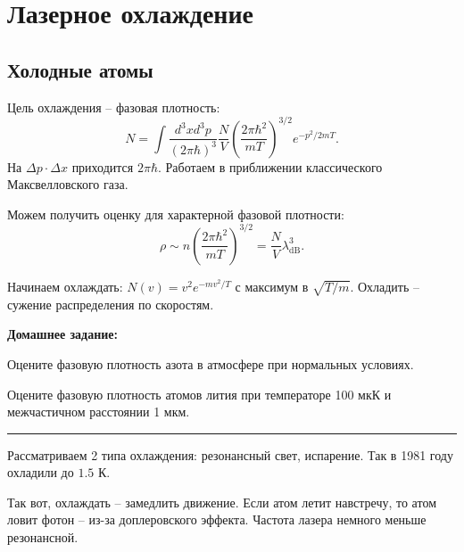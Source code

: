 
% 
% 



\section{Лазерное охлаждение} 

\subsection{Холодные атомы}

Цель охлаждения -- фазовая плотность:
\begin{equation*}
    N = \int \frac{d^3 x d^3 p}{(2\pi \hbar)^3} \frac{N}{V} 
    \left(
        \frac{2\pi \hbar^2}{mT}
    \right)^{3/2} e^{-p^2/2mT}.
\end{equation*}
На $\Delta p \cdot \Delta x$ приходится $2 \pi \hbar$. Работаем в приближении классического Максвелловского газа. 

Можем получить оценку для характерной фазовой плотности:
\begin{equation*}
    \rho \sim n     \left(
        \frac{2\pi \hbar^2}{mT}
    \right)^{3/2}  = \frac{N}{V} \lambda^3_{\text{dB}}.
\end{equation*}



Начинаем охлаждать: $N(v) = v^2 e^{-mv^2/T}$ с максимум в $\sqrt{T/m}$. Охладить -- сужение распределения по скоростям. 



\phantom{42}

\noindent
\textbf{Домашнее задание:} \hrulefill
\vspace{-2mm}
\begin{enumerate*}
    \item Оцените фазовую плотность азота в атмосфере при нормальных условиях.
    \item Оцените фазовую плотность атомов лития при температоре 100 мкК и межчастичном расстоянии 1 мкм.
\end{enumerate*}
\hrule
\phantom{42}

Рассматриваем 2 типа охлаждения: резонансный свет, испарение. Так в 1981 году охладили до $1.5$ К. 

Так вот, охлаждать -- замедлить движение. 
Если атом летит навстречу, то атом ловит фотон -- из-за доплеровского эффекта. Частота лазера немного меньше резонансной.


